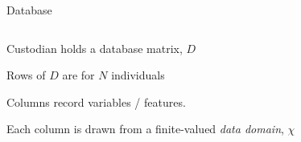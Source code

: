 \begin{frame}{Database}
\begin{columns}[T] %
\begin{column}{.58\textwidth}
  \begin{wideitemize}
	  \item Custodian holds a database matrix, $D$
	  \item Rows of $D$ are for $N$ individuals
	  \item Columns record variables / features.
	  \item Each column is drawn from a finite-valued \emph{data domain}, $\chi$
  \end{wideitemize}

  
\end{column}%
\hfill%
\begin{column}{.38\textwidth}
\end{column}%
\end{columns}
\end{frame}

